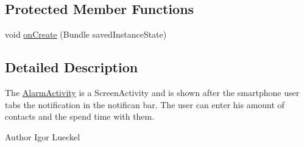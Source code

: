 \subsection*{Protected Member Functions}
\begin{DoxyCompactItemize}
\item 
void \hyperlink{classcom_1_1ovgu_1_1zim_1_1_alarm_activity_a922dfea3bce377d5fb7dbc43c975a9c5}{on\-Create} (Bundle saved\-Instance\-State)
\end{DoxyCompactItemize}


\subsection{Detailed Description}
The \hyperlink{classcom_1_1ovgu_1_1zim_1_1_alarm_activity}{Alarm\-Activity} is a Screen\-Activity and is shown after the smartphone user tabs the notification in the notifican bar. The user can enter his amount of contacts and the spend time with them. \begin{DoxyAuthor}{Author}
Igor Lueckel 
\end{DoxyAuthor}


